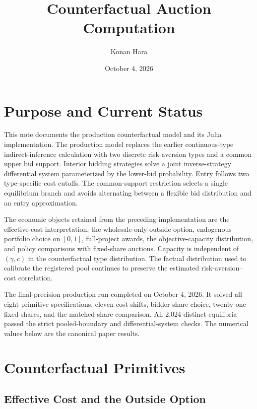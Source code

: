 \documentclass[10pt]{article}
\title{Counterfactual Auction Computation}
\author{Konan Hara}
\date{October 4, 2026}
\begin{document}
\maketitle

\section{Purpose and Current Status}

This note documents the production counterfactual model and its Julia
implementation.  The production model replaces the earlier continuous-type
indirect-inference calculation with two discrete risk-aversion types and a
common upper bid support.  Interior bidding strategies solve a joint
inverse-strategy differential system parameterized by the lower-bid
probability.  Entry follows two
type-specific cost cutoffs.  The common-support restriction selects a single
equilibrium branch and avoids alternating between a flexible bid distribution
and an entry approximation.

The economic objects retained from the preceding implementation are the
effective-cost interpretation, the wholesale-only outside option, endogenous
portfolio choice on $[0,1]$, full-project awards, the objective-capacity
distribution, and policy comparisons with fixed-share auctions.  Capacity is
independent of $(\gamma,c)$ in the counterfactual type distribution.  The
factual distribution used to calibrate the registered pool continues to
preserve the estimated risk-aversion--cost correlation.

The final-precision production run completed on October 4, 2026.  It
solved all eight primitive specifications, eleven cost shifts, bidder share
choice, twenty-one fixed shares, and the matched-share comparison.  All 2,024
distinct equilibria passed the strict pooled-boundary and differential-system
checks.  The numerical values below are the canonical paper results.

\section{Counterfactual Primitives}

\subsection{Effective Cost and the Outside Option}
\end{document}
